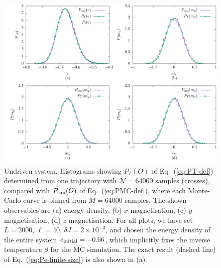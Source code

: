 \documentclass[aps,pre,twocolumn,notitlepage,floats,10pt]{revtex4-1}
\begin{document}
\begin{figure}[!ht]
  \includegraphics[width=\linewidth]{figs/fig-2-undriven-histograms.pdf}
  \caption{
    Undriven system. Histograms showing $P_T(O)$ of Eq.~(\ref{eq:PT-def})
    determined from one trajectory with $\mathcal{N}=64000$ samples (crosses),
    compared with $P_{\rm can}(O)$ of Eq.~(\ref{eq:PMC-def}), where each
    Monte-Carlo curve is binned from $M=64000$ samples.
    The shown observables are
    (a) energy density,
    (b) $x$-magnetisation,
    (c) $y$-magnetisation,
    (d) $z$-magnetisation.
    For all plots, we have set $L=2000$, $\ell=40$, 
    $\delta J = 2\times10^{-3}$, and chosen the energy density of the entire system
    $e_{\rm initial}=-0.66$, which implicitly fixes the inverse temperature $\beta$
    for the MC simulation.
    The exact result (dashed line) of Eq.~(\ref{eq:Pe-finite-size}) is also
    shown in (a).
  } \label{fig:mchist}
\end{figure}
\end{document}
